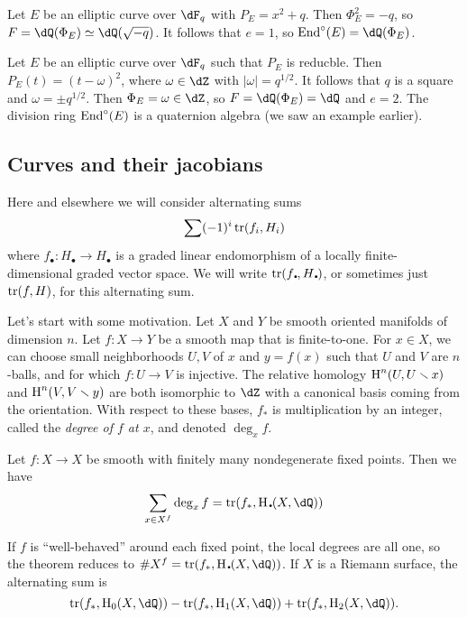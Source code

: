 \begin{example}
Let $E$ be an elliptic curve over $\dF_q$ with $P_E=x^2+q$. Then $\Phi_E^2=-q$, 
so $F=\dQ(\Phi_E)\simeq\dQ(\sqrt{-q})$. It follows that $e=1$, so  
$\End^\circ(E)=\dQ(\Phi_E)$. 
\end{example}

\begin{example}
Let $E$ be an elliptic curve over $\dF_q$ such that $P_E$ is reducble. Then 
$P_E(t)=(t-\omega)^2$, where $\omega\in \dZ$ with $|\omega|=q^{1/2}$. It 
follows that $q$ is a square and $\omega=\pm q^{1/2}$. Then 
$\Phi_E=\omega\in \dZ$, so $F=\dQ(\Phi_E)=\dQ$ and $e=2$. The division ring  
$\operatorname{End}^\circ (E)$ is a quaternion algebra (we saw an example earlier). 
\end{example}


\subsection{Curves and their jacobians} %

Here and elsewhere we will consider alternating sums 
\[
  \sum (-1)^i \operatorname{tr}(f_i,H_i)
\]
where $f_\bullet:H_\bullet \to H_\bullet$ is a graded linear endomorphism of a 
locally finite-dimensional graded vector space. We will write 
$\trace(f_\bullet,H_\bullet)$, or sometimes just $\operatorname{tr}(f,H)$, for this 
alternating sum. 

Let's start with some motivation. Let $X$ and $Y$ be smooth oriented manifolds 
of dimension $n$. Let $f:X\to Y$ be a smooth map that is finite-to-one. For 
$x\in X$, we can choose small neighborhoods $U,V$ of $x$ and $y=f(x)$ such 
that $U$ and $V$ are $n$-balls, and for which $f:U\to V$ is injective. 
The relative homology $\operatorname{H}^n(U,U\smallsetminus x)$ and $\operatorname{H}^n(V,V\smallsetminus y)$ are 
both isomorphic to $\dZ$ with a canonical basis coming from the orientation. 
With respect to these bases, $f_\ast$ is multiplication by an integer, called 
the \emph{degree of $f$ at $x$}, and denoted $\deg_x f$. 

\begin{theorem}[Lefschetz]
Let $f:X\to X$ be smooth with finitely many nondegenerate fixed points. Then 
we have 
\[
  \sum_{x\in X^f} \deg_x f = \trace(f_\ast,\h_\bullet(X,\dQ))
\]
\end{theorem}
If $f$ is ``well-behaved'' around each fixed point, the local degrees are all 
one, so the theorem reduces to $\# X^f=\trace(f_\ast,\h_\bullet(X,\dQ))$. If 
$X$ is a Riemann surface, the alternating sum is 
\[
  \trace(f_\ast,\h_0(X,\dQ)) - \trace(f_\ast,\h_1(X,\dQ)) + \trace(f_\ast,\h_2(X,\dQ))\text{.}
\]

